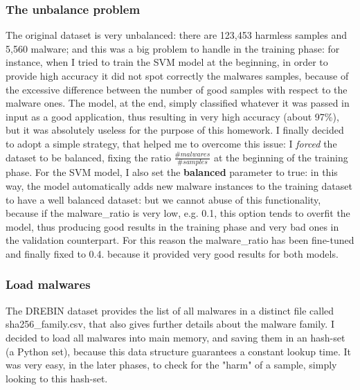\documentclass[12pt]{article}
\begin{document}
\subsubsection{The unbalance problem}
\label{sec:unbalance}
The original dataset is very unbalanced: there are 123,453 harmless samples and 5,560 malware; and this was a big problem to handle in the training phase: for instance, when I tried to train the SVM model at the beginning, in order to provide high accuracy it did not spot correctly the malwares samples, because of the excessive difference between the number of good samples with respect to the malware ones. The model, at the end, simply classified whatever it was passed in input as a good application, thus resulting in very high accuracy (about 97\%), but it was absolutely useless for the purpose of this homework. I finally decided to adopt a simple strategy, that helped me to overcome this issue: I \textit{forced} the dataset to be balanced, fixing the ratio $ \frac{\# malwares}{\# samples}$ at the beginning of the training phase. For the SVM model, I also set the \textbf{balanced} parameter to true: in this way, the model automatically adds new malware instances to the training dataset to have a well balanced dataset: but we cannot abuse of this functionality, because if the malware\_ratio is very low, e.g. 0.1, this option tends to overfit the model, thus producing good results in the training phase and very bad ones in the validation counterpart. For this reason the malware\_ratio has been fine-tuned and finally fixed to 0.4. because it provided very good results for both models.

\subsubsection{Load malwares}
The DREBIN dataset provides the list of all malwares in a distinct file called sha256\_family.csv, that also gives further details about the malware family.  I decided to load all malwares into main memory, and saving them in an hash-set (a Python set), because this data structure guarantees a constant lookup time. It was very easy, in the later phases, to check for the "harm" of a sample, simply looking to this hash-set. 
\end{document}
